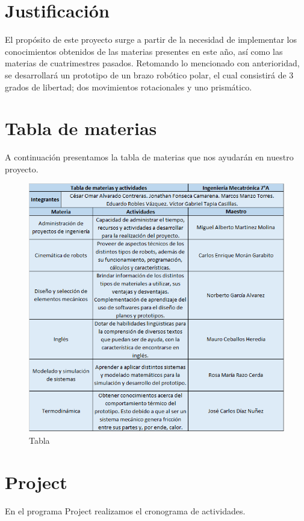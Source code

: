 \documentclass[12pt,a4paper]{report}
\begin{document}
\section{Justificación}
El propósito de este proyecto surge a partir de la necesidad de implementar los conocimientos obtenidos de las materias presentes en este año, así como las materias de cuatrimestres pasados.
Retomando lo mencionado con anterioridad, se desarrollará un prototipo de un brazo robótico polar, el cual consistirá de 3 grados de libertad; dos movimientos rotacionales y uno prismático.

\section{Tabla de materias}
A continuación presentamos la tabla de materias que nos ayudarán en nuestro proyecto.\\
\begin{figure}
  \centering
    \includegraphics{Tabla.png}
  \caption{Tabla}
  \label{fig:Tabla}
\end{figure}


\section{Project}
En el programa Project realizamos el cronograma de actividades.\\
\end{document}
